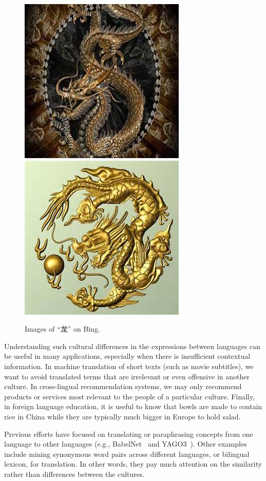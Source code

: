 \begin{figure}[th]
\centering
\includegraphics[width=0.49\columnwidth]{img/loong1}
\hfill
\includegraphics[width=0.49\columnwidth]{img/loong2}
\caption{Images of ``龙'' on Bing.}
\label{fig:loong}
\end{figure}

Understanding such cultural differences in the expressions 
between languages can be useful in many applications, especially
when there is insufficient contextual information. 
In machine translation of short texts (such as movie subtitles),
we want to avoid translated terms that are 
irrelevant or even offensive in another culture. 
In cross-lingual recommendation systems, we may 
only recommend products or services most relevant to 
the people of a particular culture. Finally, in
foreign language education, it is useful to know that bowls 
are made to contain rice in China while they are typically much bigger 
in Europe to hold salad. 

Previous efforts have focused on translating or paraphrasing
concepts from one language to other languages (e.g., BabelNet~\cite{Navigli:2012dn}
and YAGO3~\cite{mahdisoltani2014yago3}). 
Other examples include mining synonymous word pairs across
different languages\cite{Mikolov:2013tp}, 
or bilingual lexicon\cite{linard2015bilingual}, for translation.
In other words, they pay much attention on the similarity rather
than differences between the cultures.

